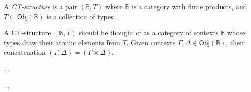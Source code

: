 
\begin{definition}
  \label{def:CT-structure}
  A \emph{CT-structure} is a pair $(\mathbb{B},T)$ where $\mathbb{B}$
  is a category with finite products, and $T \subseteq
  \mathsf{Obj}(\mathbb{B})$ is a collection of types.
\end{definition}

A CT-structure $(\mathbb{B},T)$ should be thought of as a category of
contexts $\mathbb{B}$ whose types draw their atomic elements from $T$.
Given contexts $\Gamma,\Delta \in \mathsf{Obj}(\mathbb{B})$, their concatenation
$(\Gamma,\Delta) = (\Gamma \times \Delta)$.

\begin{definition}
  \label{def:simple-total-cat}
  ...
\end{definition}


\begin{definition}
  \label{def:simple-fibration}
  ...
\end{definition}


